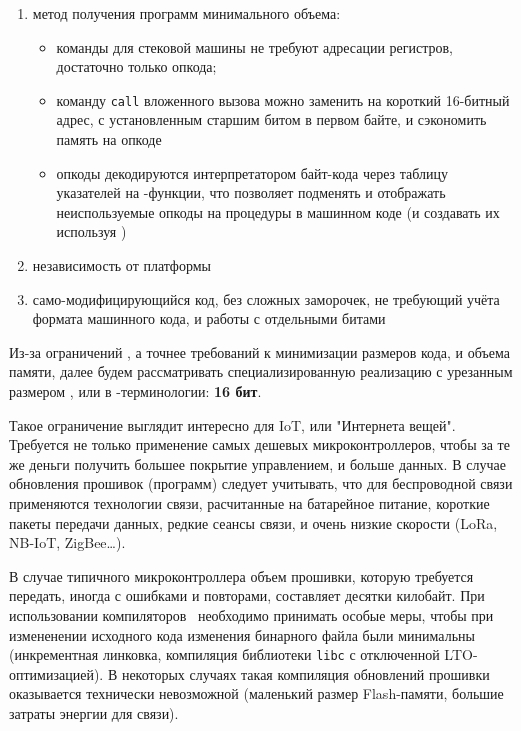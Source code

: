 \clearpage
{}\label{bc}\secdown

\begin{enumerate}
\item метод получения программ минимального объема:
\begin{itemize}[nosep]
    \item команды для стековой машины не требуют адресации регистров, достаточно только
    опкода;
    \item команду \verb|call| вложенного вызова можно заменить на короткий 16-битный адрес, с установленным старшим
    битом в первом байте, и сэкономить память на опкоде
    \item опкоды декодируются интерпретатором байт-кода через таблицу указателей
    на \ci-функции, что позволяет подменять и отображать неиспользуемые опкоды
    на процедуры в машинном
    коде (и создавать их используя )
\end{itemize}
\item независимость от платформы
\item само-модифицирующийся код, без сложных заморочек, не требующий учёта
формата машинного кода, и работы с отдельными битами
\end{enumerate}

Из-за ограничений , а точнее требований к минимизации
размеров кода, и объема памяти, далее будем рассматривать специализированную
реализацию с урезанным размером , или  в
\F-терминологии: \textbf{16 бит}.

Такое ограничение выглядит интересно для IoT, или "Интернета вещей". Требуется
не только применение самых дешевых микроконтроллеров, чтобы за те же деньги
получить большее покрытие управлением, и больше данных. В случае обновления
прошивок (программ) следует учитывать, что для беспроводной связи применяются
технологии связи, расчитанные на батарейное питание, короткие пакеты передачи
данных, редкие сеансы связи, и очень низкие скорости (LoRa, NB-IoT,
ZigBee\ldots).

В случае типичного микроконтроллера объем прошивки, которую требуется передать,
иногда с ошибками и повторами, составляет десятки килобайт. При использовании
компиляторов \ci\ необходимо принимать особые меры, чтобы при измененении
исходного кода изменения бинарного файла были минимальны (инкрементная линковка,
компиляция библиотеки \verb|libc| с отключенной LTO-оптимизацией). В некоторых
случаях такая компиляция обновлений прошивки оказывается технически невозможной
(маленький размер Flash-памяти, большие затраты энергии для связи).

